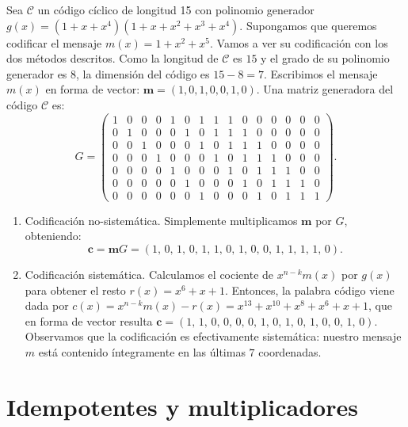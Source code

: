 \begin{example}
  Sea \(\mathcal C\) un código cíclico de longitud 15 con polinomio generador \(g(x) = (1 + x + x^4)(1 + x + x^2 + x^3 + x^4)\). Supongamos que queremos codificar el mensaje \(m(x) = 1 + x^2 + x^5\). Vamos a ver su codificación con los dos métodos descritos. Como la longitud de \(\mathcal C\) es \(15\) y el grado de su polinomio generador es \(8\), la dimensión del código es \(15 - 8 = 7\). Escribimos el mensaje \(m(x)\) en forma de vector: \(\mathbf{m}= (1, 0, 1, 0, 0, 1, 0)\). Una matriz generadora del código \(\mathcal C\) es: 
  \[
    G = \left(\begin{array}{rrrrrrrrrrrrrrr}
      1 & 0 & 0 & 0 & 1 & 0 & 1 & 1 & 1 & 0 & 0 & 0 & 0 & 0 & 0 \\
      0 & 1 & 0 & 0 & 0 & 1 & 0 & 1 & 1 & 1 & 0 & 0 & 0 & 0 & 0 \\
      0 & 0 & 1 & 0 & 0 & 0 & 1 & 0 & 1 & 1 & 1 & 0 & 0 & 0 & 0 \\
      0 & 0 & 0 & 1 & 0 & 0 & 0 & 1 & 0 & 1 & 1 & 1 & 0 & 0 & 0 \\
      0 & 0 & 0 & 0 & 1 & 0 & 0 & 0 & 1 & 0 & 1 & 1 & 1 & 0 & 0 \\
      0 & 0 & 0 & 0 & 0 & 1 & 0 & 0 & 0 & 1 & 0 & 1 & 1 & 1 & 0 \\
      0 & 0 & 0 & 0 & 0 & 0 & 1 & 0 & 0 & 0 & 1 & 0 & 1 & 1 & 1
      \end{array}\right).
  \]
  \begin{enumerate}
    \item Codificación no-sistemática. Simplemente multiplicamos \(\mathbf{m}\) por \(G\), obteniendo:
    \[
      \mathbf{c} = \mathbf{m}G = \left(1,\,0,\,1,\,0,\,1,\,1,\,0,\,1,\,0,\,0,\,1,\,1,\,1,\,1,\,0\right).
    \]
    \item Codificación sistemática. Calculamos el cociente de \(x^{n-k}m(x)\) por \(g(x)\) para obtener el resto \(r(x) = x^{6} + x + 1\). Entonces, la palabra código viene dada por \(c(x) = x^{n-k}m(x) - r(x) = x^{13} + x^{10} + x^{8} + x^{6} + x + 1\), que en forma de vector resulta \(\mathbf{c} = \left(1,\,1,\,0,\,0,\,0,\,0,\,1,\,0,\,1,\,0,\,1,\,0,\,0,\,1,\,0\right)\). Observamos que la codificación es efectivamente sistemática: nuestro mensaje \(m\) está contenido íntegramente en las últimas \(7\) coordenadas.
  \end{enumerate}
\end{example}

\section{Idempotentes y multiplicadores}

